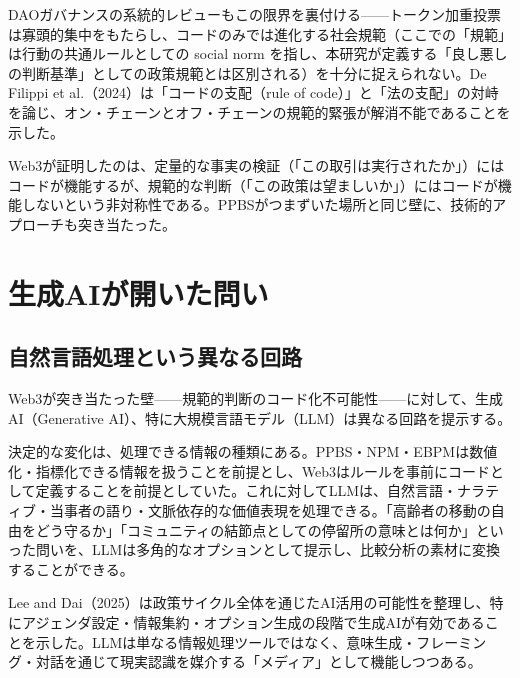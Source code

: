 DAOガバナンスの系統的レビューもこの限界を裏付ける——トークン加重投票は寡頭的集中をもたらし、コードのみでは進化する社会規範（ここでの「規範」は行動の共通ルールとしての social norm を指し、本研究が定義する「良し悪しの判断基準」としての政策規範とは区別される）を十分に捉えられない\cite{liu2023dao_review}。De Filippi et al.（2024）は「コードの支配（rule of code）」と「法の支配」の対峙を論じ、オン・チェーンとオフ・チェーンの規範的緊張が解消不能であることを示した\cite{defilippi2024ruleofcode}。

Web3が証明したのは、定量的な事実の検証（「この取引は実行されたか」）にはコードが機能するが、規範的な判断（「この政策は望ましいか」）にはコードが機能しないという非対称性である\cite{defilippi2020confidence,allessie2019blockchain}。PPBSがつまずいた場所と同じ壁に、技術的アプローチも突き当たった。

\section{生成AIが開いた問い}
\label{sec:intro_ai_vision}

\subsection{自然言語処理という異なる回路}
\label{subsec:intro_llm}

Web3が突き当たった壁——規範的判断のコード化不可能性——に対して、生成AI（Generative AI）、特に大規模言語モデル（LLM）は異なる回路を提示する。

決定的な変化は、処理できる情報の種類にある。PPBS・NPM・EBPMは数値化・指標化できる情報を扱うことを前提とし、Web3はルールを事前にコードとして定義することを前提としていた。これに対してLLMは、自然言語・ナラティブ・当事者の語り・文脈依存的な価値表現を処理できる。「高齢者の移動の自由をどう守るか」「コミュニティの結節点としての停留所の意味とは何か」といった問いを、LLMは多角的なオプションとして提示し、比較分析の素材に変換することができる。

Lee and Dai（2025）は政策サイクル全体を通じたAI活用の可能性を整理し、特にアジェンダ設定・情報集約・オプション生成の段階で生成AIが有効であることを示した\cite{lee2025ai_policy_cycle}。LLMは単なる情報処理ツールではなく、意味生成・フレーミング・対話を通じて現実認識を媒介する「メディア」として機能しつつある\cite{siraj2025generative}。

